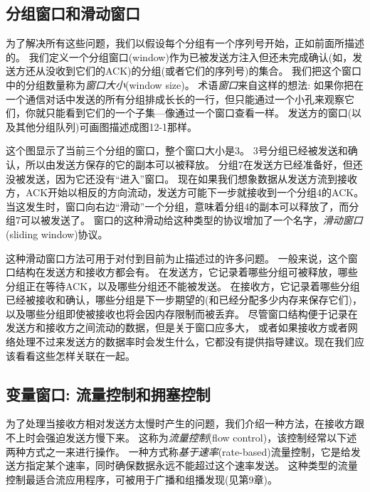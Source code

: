 \documentclass{../main.tex}{subfiles}
\begin{document}
\subsection{分组窗口和滑动窗口}
为了解决所有这些问题，我们以假设每个分组有一个序列号开始，正如前面所描述的。
我们定义一个分组窗口(window)作为已被发送方注入但还未完成确认(如，发送方还从没收到它们的ACK)的分组(或者它们的序列号)的集合。
我们把这个窗口中的分组数量称为\emph{窗口大小}(window size)。
术语\emph{窗口}来自这样的想法:
如果你把在一个通信对话中发送的所有分组排成长长的一行，但只能通过一个小孔来观察它们，你就只能看到它们的一个子集---像通过一个窗口查看一样。
发送方的窗口(以及其他分组队列)可画图描述成图12-1那样。

这个图显示了当前三个分组的窗口，整个窗口大小是3。
3号分组已经被发送和确认，所以由发送方保存的它的副本可以被释放。
分组7在发送方已经准备好，但还没被发送，因为它还没有``进入''窗口。
现在如果我们想象数据从发送方流到接收方，ACK开始以相反的方向流动，发送方可能下一步就接收到一个分组4的ACK。
当这发生时，窗口向右边``滑动''一个分组，意味着分组4的副本可以释放了，而分组7可以被发送了。
窗口的这种滑动给这种类型的协议增加了一个名字，\emph{滑动窗口}(sliding window)协议。

这种滑动窗口方法可用于对付到目前为止描述过的许多问题。
一般来说，这个窗口结构在发送方和接收方都会有。
在发送方，它记录着哪些分组可被释放，哪些分组正在等待ACK，以及哪些分组还不能被发送。
在接收方，它记录着哪些分组已经被接收和确认，哪些分组是下一步期望的(和已经分配多少内存来保存它们)，以及哪些分组即使被接收也将会因内存限制而被丢弃。
尽管窗口结构便于记录在发送方和接收方之间流动的数据，但是关于窗口应多大，
    或者如果接收方或者网络处理不过来发送方的数据率时会发生什么，它都没有提供指导建议。现在我们应该看看这些怎样关联在一起。


\subsection{变量窗口: 流量控制和拥塞控制}
为了处理当接收方相对发送方太慢时产生的问题，我们介绍一种方法，在接收方跟不上时会强迫发送方慢下来。
这称为\emph{流量控制}(flow control)，该控制经常以下述两种方式之一来进行操作。
一种方式称\emph{基于速率}(rate-based)流量控制，它是给发送方指定某个速率，同时确保数据永远不能超过这个速率发送。
这种类型的流量控制最适合流应用程序，可被用于广播和组播发现(见第9章)。
\end{document}
